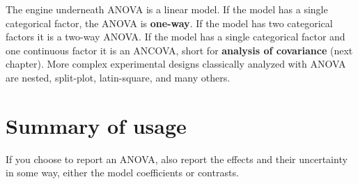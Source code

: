\documentclass[]{book}
\begin{document}
The engine underneath ANOVA is a linear model. If the model has a single
categorical factor, the ANOVA is \textbf{one-way}. If the model has two
categorical factors it is a two-way ANOVA. If the model has a single
categorical factor and one continuous factor it is an ANCOVA, short for
\textbf{analysis of covariance} (next chapter). More complex
experimental designs classically analyzed with ANOVA are nested,
split-plot, latin-square, and many others.

\section{Summary of usage}\label{summary-of-usage}

If you choose to report an ANOVA, also report the effects and their
uncertainty in some way, either the model coefficients or contrasts.
\end{document}
